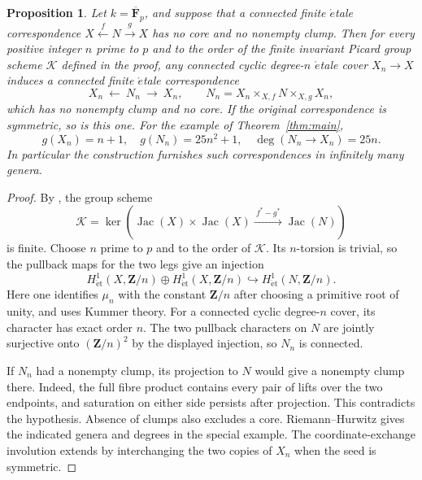 \documentclass[11pt,a4paper,reqno]{amsart}
\newtheorem{proposition}[theorem]{Proposition}
\newcommand{\FF}{\mathbf F}
\newcommand{\Jac}{\operatorname{Jac}}
\newcommand{\et}{\mathrm{\acute et}}
\begin{document}
\begin{proposition}\label{prop:propagation}
Let $k=\overline{\FF}_p$, and suppose that a connected finite
\(\acute{e}\)tale correspondence
$X\xleftarrow{f}N\xrightarrow{g}X$ has no core and no nonempty
clump. Then for every positive integer $n$ prime to $p$ and to the order of
the finite invariant Picard group scheme $\mathcal K$ defined in the proof, any
connected cyclic degree-$n$ \(\acute{e}\)tale cover $X_n\to X$
induces a connected finite \(\acute{e}\)tale correspondence
\[
 X_n\ \longleftarrow\ N_n\ \longrightarrow\ X_n,
 \qquad
 N_n=X_n\times_{X,f}N\times_{X,g}X_n,
\]
which has no nonempty clump and no core.  If the original
correspondence is symmetric, so is this one. For the example of
Theorem~\ref{thm:main},
\[
 g(X_n)=n+1,\quad g(N_n)=25n^2+1,
 \quad \deg(N_n\to X_n)=25n.
\]
In particular the construction furnishes such correspondences
in infinitely many genera.
\end{proposition}
\begin{proof}
By \cite[Lemma 8.9]{Kri18}, the group scheme
\[
 \mathcal K=\ker\left(\Jac(X)\times\Jac(X)
 \xrightarrow{\ f^*-g^*\ }\Jac(N)\right)
\]
is finite. Choose $n$ prime to $p$ and to the order of
$\mathcal K$.  Its $n$-torsion is trivial, so the pullback maps for
the two legs give an injection
\[
 H^1_{\et}(X,\mathbf Z/n)\oplus H^1_{\et}(X,\mathbf Z/n)
 \hookrightarrow H^1_{\et}(N,\mathbf Z/n).
\]
Here one identifies $\mu_n$ with the constant $\mathbf Z/n$
after choosing a primitive root of unity, and uses Kummer theory.
For a connected cyclic degree-$n$ cover, its character has exact
order $n$. The two pullback characters on $N$ are jointly
surjective onto $(\mathbf Z/n)^2$ by the displayed injection, so
$N_n$ is connected.

If $N_n$ had a nonempty clump, its projection to $N$ would give a
nonempty clump there. Indeed, the full fibre product contains every
pair of lifts over the two endpoints, and saturation on either side
persists after projection. This contradicts the hypothesis. Absence
of clumps also excludes a core.
Riemann--Hurwitz gives the indicated genera and degrees in the
special example. The coordinate-exchange involution extends by
interchanging the two copies of $X_n$ when the seed is symmetric.
\end{proof}
\end{document}
